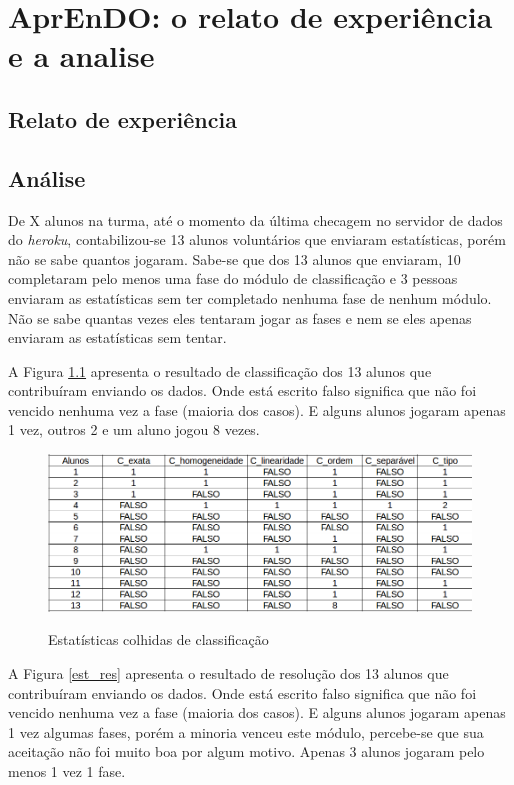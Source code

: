 \chapter[AprEnDO: o relato de experiência e a analise]{AprEnDO: o relato de experiência e a analise}
\section[Relato de experiência]{Relato de experiência}

\section[Análise]{Análise}

De X alunos na turma, até o momento da última checagem no servidor de dados do \textit{heroku}, contabilizou-se 13 alunos voluntários que enviaram estatísticas, porém não se sabe quantos jogaram. Sabe-se que dos 13 alunos que enviaram, 10 completaram pelo menos uma fase do módulo de classificação e 3 pessoas enviaram as estatísticas sem ter completado nenhuma fase de nenhum módulo. Não se sabe quantas vezes eles tentaram jogar as fases e nem se eles apenas enviaram as estatísticas sem tentar. 

A Figura \ref{est_cla} apresenta o resultado de classificação dos 13 alunos que contribuíram enviando os dados. Onde está escrito falso significa que não foi vencido nenhuma vez a fase (maioria dos casos). E alguns alunos jogaram apenas 1 vez, outros 2 e um aluno jogou 8 vezes.

\begin{figure}[H]
\centering
\caption{Estatísticas colhidas de classificação}
\includegraphics[scale=0.5]{figuras/estatisticas/estatisticas_classificacao.png}
\label{est_cla}
\end{figure}


A Figura \ref{est_res} apresenta o resultado de resolução dos 13 alunos que contribuíram enviando os dados. Onde está escrito falso significa que não foi vencido nenhuma vez a fase (maioria dos casos). E alguns alunos jogaram apenas 1 vez algumas fases, porém a minoria venceu este módulo, percebe-se que sua aceitação não foi muito boa por algum motivo. Apenas 3 alunos jogaram pelo menos 1 vez 1 fase.

